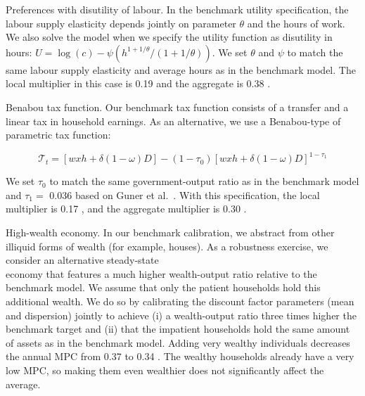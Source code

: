 \documentclass[\latexroot/\projectname]{subfiles}
\begin{document}
Preferences with disutility of labour. In the benchmark utility specification, the labour supply elasticity depends jointly on parameter $\theta$ and the hours of work. We also solve the model when we specify the utility function as disutility in hours: $U=\log (c)-\psi\left(h^{1+1 / \theta} /(1+1 / \theta)\right)$. We set $\theta$ and $\psi$ to match the same labour supply elasticity and average hours as in the benchmark model. The local multiplier in this case is 0.19 and the aggregate is 0.38 .

Benabou tax function. Our benchmark tax function consists of a transfer and a linear tax in household earnings. As an alternative, we use a Benabou-type of parametric tax function:

$$
\mathcal{T}_{t}=[w x h+\delta(1-\omega) D]-\left(1-\tau_{0}\right)[w x h+\delta(1-\omega) D]^{1-\tau_{1}}
$$

We set $\tau_{0}$ to match the same government-output ratio as in the benchmark model and $\tau_{1}=$ 0.036 based on Guner et al.~\cite{Guner2014-xr}. With this specification, the local multiplier is 0.17 , and the aggregate multiplier is 0.30 .

High-wealth economy. In our benchmark calibration, we abstract from other illiquid forms of wealth (for example, houses). As a robustness exercise, we consider an alternative steady-state\\
economy that features a much higher wealth-output ratio relative to the benchmark model. We assume that only the patient households hold this additional wealth. We do so by calibrating the discount factor parameters (mean and dispersion) jointly to achieve (i) a wealth-output ratio three times higher the benchmark target and (ii) that the impatient households hold the same amount of assets as in the benchmark model. Adding very wealthy individuals decreases the annual MPC from 0.37 to 0.34 . The wealthy households already have a very low MPC, so making them even wealthier does not significantly affect the average.
\end{document}
